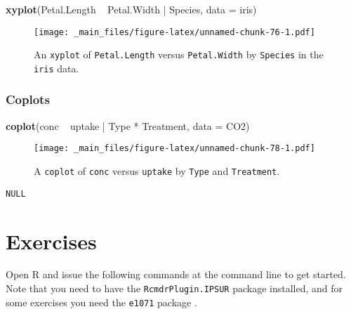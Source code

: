 \documentclass[]{book}
\newenvironment{Shaded}{\begin{snugshade}}{\end{snugshade}}
\newcommand{\KeywordTok}[1]{\textcolor[rgb]{0.13,0.29,0.53}{\textbf{{#1}}}}
\newcommand{\DataTypeTok}[1]{\textcolor[rgb]{0.13,0.29,0.53}{{#1}}}
\newcommand{\StringTok}[1]{\textcolor[rgb]{0.31,0.60,0.02}{{#1}}}
\newcommand{\NormalTok}[1]{{#1}}
\numberwithin{equation}{chapter}
\numberwithin{figure}{chapter}
\theoremstyle{plain}
\theoremstyle{definition}
\theoremstyle{remark}
\theoremstyle{definition}
\theoremstyle{definition}
\theoremstyle{remark}
\begin{document}
\begin{Shaded}
\begin{Highlighting}[]
\KeywordTok{xyplot}\NormalTok{(Petal.Length ~}\StringTok{ }\NormalTok{Petal.Width |}\StringTok{ }\NormalTok{Species, }\DataTypeTok{data =} \NormalTok{iris)}
\end{Highlighting}
\end{Shaded}

\begin{figure}[htbp]
\centering
\texttt{[image: \_main\_files/figure-latex/unnamed-chunk-76-1.pdf]}
\caption{\label{fig:unnamed-chunk-76}\small An \texttt{xyplot} of \texttt{Petal.Length}
versus \texttt{Petal.Width} by \texttt{Species} in the \texttt{iris}
data.}
\end{figure}





\subsubsection{Coplots}\label{coplots}

\begin{Shaded}
\begin{Highlighting}[]
\KeywordTok{coplot}\NormalTok{(conc ~}\StringTok{ }\NormalTok{uptake |}\StringTok{ }\NormalTok{Type *}\StringTok{ }\NormalTok{Treatment, }\DataTypeTok{data =} \NormalTok{CO2)}
\end{Highlighting}
\end{Shaded}

\begin{figure}[htbp]
\centering
\texttt{[image: \_main\_files/figure-latex/unnamed-chunk-78-1.pdf]}
\caption{\label{fig:unnamed-chunk-78}\small A \texttt{coplot} of \texttt{conc} versus
\texttt{uptake} by \texttt{Type} and \texttt{Treatment}.}
\end{figure}

\begin{verbatim}
NULL
\end{verbatim}




\section{Exercises}\label{exercises-1}

Open R and issue the following commands at the command line to get
started. Note that you need to have the \texttt{RcmdrPlugin.IPSUR}
package \autocite{RcmdrPlugin.IPSUR} installed, and for some exercises
you need the \texttt{e1071} package \autocite{e1071}.
\end{document}
